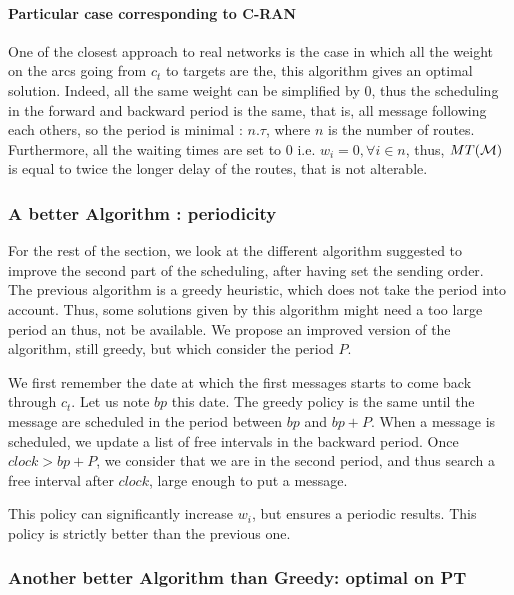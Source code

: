 \documentclass[a4paper,10pt]{article}
\begin{document}
	\paragraph{Particular case corresponding to C-RAN}
		
	One of the closest approach to real networks is the case in which all the weight on the arcs going from $c_t$ to targets are the, this algorithm gives an optimal solution. Indeed, all the same weight can be simplified by 0, thus the scheduling in the forward and backward period is the same, that is, all message following each others, so the period is minimal : $n.\tau$, where $n$ is the number of routes. Furthermore, all the waiting times are set to 0 i.e. $w_i = 0,\forall i \in n$, thus, $MT({\cal M})$ is equal to twice the longer delay of the routes, that is not alterable.

	
     \subsubsection{A better Algorithm : periodicity}
     
     For the rest of the section, we look at the different algorithm suggested to improve the second part of the scheduling, after having set the sending order.
     The previous algorithm is a greedy heuristic, which does not take the period into account. Thus, some solutions given by this algorithm might need a too large period an thus, not be available. 
     We propose an improved version of the algorithm, still greedy, but which consider the period $P$.
     
     We first remember the date at which the first messages starts to come back through $c_t$. Let us note $bp$ this date.
     The greedy policy is the same until the message are scheduled in the period between $bp$ and $bp +P$. When a message is scheduled, we update a list of free intervals in the backward period.
     Once $clock > bp+P$, we consider that we are in the second period, and thus search a free interval after $clock$, large enough to put a message.
     
     This policy can significantly increase $w_i$, but ensures a periodic results. This policy is strictly better than the previous one.
     
     \subsubsection{Another better Algorithm than Greedy: optimal on PT}
     
\end{document}
